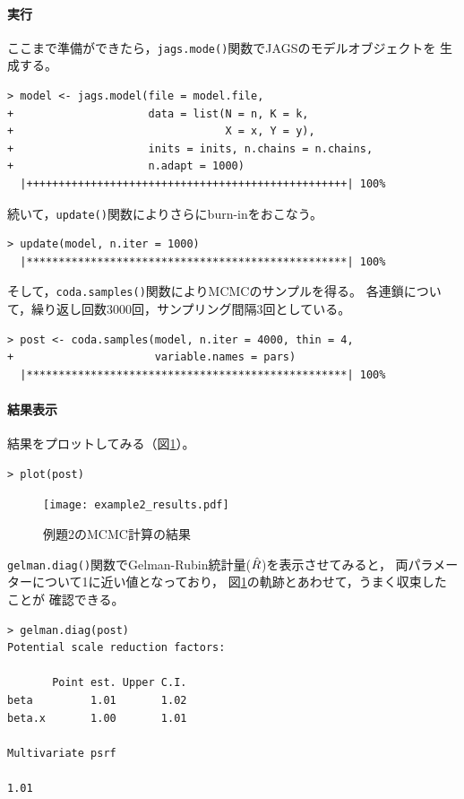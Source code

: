 \documentclass[11pt,uplatex]{jsarticle}
\begin{document}
\paragraph{実行}

ここまで準備ができたら，\texttt{jags.mode()}関数でJAGSのモデルオブジェクトを
生成する。
\begin{lstlisting}
> model <- jags.model(file = model.file,
+                     data = list(N = n, K = k,
+                                 X = x, Y = y),
+                     inits = inits, n.chains = n.chains,
+                     n.adapt = 1000)
  |++++++++++++++++++++++++++++++++++++++++++++++++++| 100%
\end{lstlisting}

続いて，\texttt{update()}関数によりさらにburn-inをおこなう。
\begin{lstlisting}
> update(model, n.iter = 1000)
  |**************************************************| 100%
\end{lstlisting}

そして，\texttt{coda.samples()}関数によりMCMCのサンプルを得る。
各連鎖について，繰り返し回数3000回，サンプリング間隔3回としている。

\begin{lstlisting}
> post <- coda.samples(model, n.iter = 4000, thin = 4,
+                      variable.names = pars)
  |**************************************************| 100%
\end{lstlisting}


\paragraph{結果表示}

結果をプロットしてみる（図\ref{plot_coda}）。
\begin{lstlisting}
> plot(post)
\end{lstlisting}


\begin{figure}[htbp]
	\begin{center}
		\texttt{[image: example2\_results.pdf]}
	\end{center}
	\caption{例題2のMCMC計算の結果}
	\label{plot_coda}
\end{figure}


\texttt{gelman.diag()}関数でGelman-Rubin統計量($\Hat{R}$)を表示させてみると，
両パラメーターについて1に近い値となっており，
図\ref{plot_coda}の軌跡とあわせて，うまく収束したことが
確認できる。
\begin{lstlisting}
> gelman.diag(post)
Potential scale reduction factors:

       Point est. Upper C.I.
beta         1.01       1.02
beta.x       1.00       1.01

Multivariate psrf

1.01
\end{lstlisting}
\end{document}
